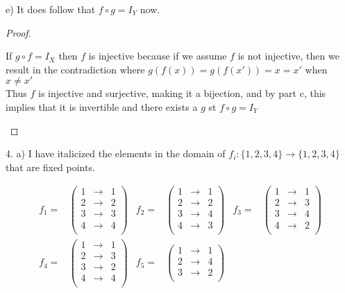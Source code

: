 \documentclass[11pt]{article}
\newcommand{\bproof}{\begin{proof}
$ $ \\
\begin{adjustwidth}{3em}{0pt}
}
\newcommand{\eproof}{\end{adjustwidth}
\end{proof}}
\begin{document}
\begin{flushleft}
e) It does follow that $f \circ g = I_Y$ now.

\bproof
If $g \circ f = I_X$ then $f$ is injective because if we assume $f$ is not injective, then we result in the contradiction where $g(f(x)) = g(f(x')) = x = x'$ when $x \neq x'$ \\
Thus $f$ is injective and surjective, making it a bijection, and by part c, this implies that it is invertible and there exists a $g$ st $f \circ g = I_Y$
\eproof

\newpage

4. a) I have italicized the elements in the domain of $f_i: \{ 1, 2, 3, 4 \} \rightarrow \{ 1, 2, 3, 4 \}$ that are fixed points.

\begin{align*}
f_1 = &
\begin{pmatrix}
\mathit{1} & \rightarrow & 1\\
\mathit{2} & \rightarrow & 2\\
\mathit{3} & \rightarrow & 3\\
\mathit{4} & \rightarrow & 4\\
\end{pmatrix} &
f_2 = & 
\begin{pmatrix}
\mathit{1} & \rightarrow & 1\\
\mathit{2} & \rightarrow & 2\\
3 & \rightarrow & 4\\
4 & \rightarrow & 3\\
\end{pmatrix} &
f_3 = & 
\begin{pmatrix}
\mathit{1} & \rightarrow & 1\\
2 & \rightarrow & 3\\
3 & \rightarrow & 4\\
4 & \rightarrow & 2\\
\end{pmatrix} \\
f_4 = &
\begin{pmatrix}
\mathit{1} & \rightarrow & 1\\
2 & \rightarrow & 3\\
3 & \rightarrow & 2\\
4 & \rightarrow & 4\\
\end{pmatrix} &
f_5 = & 
\begin{pmatrix}
\mathit{1} & \rightarrow & 1\\
2 & \rightarrow & 4\\
3 & \rightarrow & 2\\

\end{pmatrix}
\end{align*}
\end{flushleft}
\end{document}
